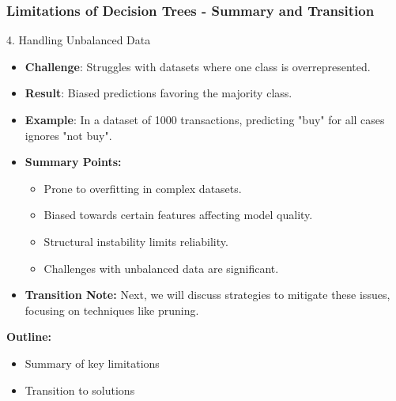 \documentclass[aspectratio=169]{beamer}
\begin{document}
\begin{frame}[fragile]
    \frametitle{Limitations of Decision Trees - Summary and Transition}
    \begin{block}{4. Handling Unbalanced Data}
        \begin{itemize}
            \item \textbf{Challenge}: Struggles with datasets where one class is overrepresented.
            \item \textbf{Result}: Biased predictions favoring the majority class.
            \item \textbf{Example}: In a dataset of 1000 transactions, predicting "buy" for all cases ignores "not buy".
        \end{itemize}
    \end{block}
    
    \begin{itemize}
        \item \textbf{Summary Points:}
        \begin{itemize}
            \item Prone to overfitting in complex datasets.
            \item Biased towards certain features affecting model quality.
            \item Structural instability limits reliability.
            \item Challenges with unbalanced data are significant.
        \end{itemize}
        \item \textbf{Transition Note:} Next, we will discuss strategies to mitigate these issues, focusing on techniques like pruning.
    \end{itemize}
    
    \textbf{Outline:}
    \begin{itemize}
        \item Summary of key limitations
        \item Transition to solutions
    \end{itemize}
\end{frame}
\end{document}
